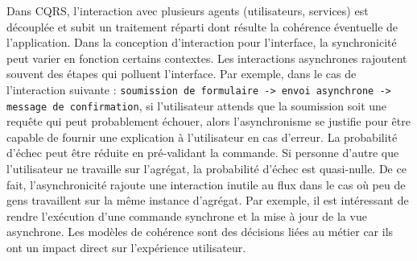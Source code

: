 Dans \gls{CQRS}, l'interaction avec plusieurs agents (utilisateurs, services) est 
découplée et subit un traitement réparti 
dont résulte la cohérence éventuelle de l'application. 
Dans la conception d'interaction pour l'interface, la synchronicité peut varier en 
fonction certains contextes. 
Les interactions asynchrones rajoutent souvent des étapes qui polluent l'interface.  
Par exemple, dans le cas de l'interaction suivante : \texttt{soumission de formulaire -> envoi 
asynchrone -> 
message de confirmation}, si l'utilisateur attends que la soumission soit une 
requête qui peut probablement échouer, alors l'asynchronisme se justifie pour être 
capable de fournir une explication à l'utilisateur en cas d'erreur. La probabilité 
d'échec peut être réduite en pré-validant la commande. Si personne d'autre que 
l'utilisateur ne travaille sur l'agrégat, la probabilité d'échec est quasi-nulle. De ce fait, 
l'asynchronicité rajoute une interaction inutile au flux dans le cas où peu de gens 
travaillent sur la même instance d'agrégat.
Par exemple, il est intéressant de rendre l'exécution d'une 
commande synchrone et la mise à jour de la vue asynchrone. Les modèles de 
cohérence sont des décisions liées au métier car ils ont un impact direct sur 
l'expérience utilisateur. 


%
%


